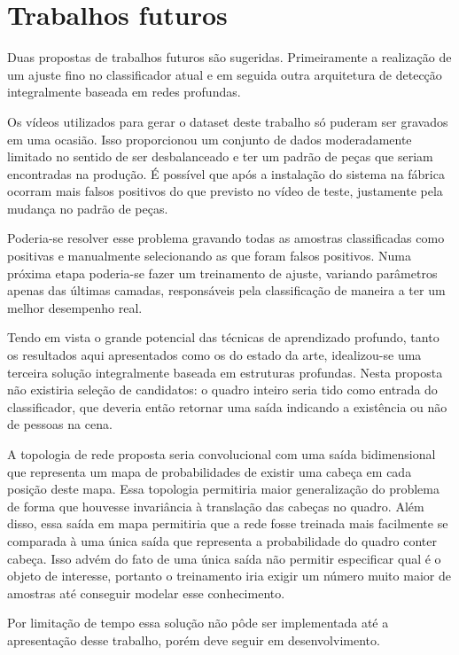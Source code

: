 \section*{Trabalhos futuros}

Duas propostas de trabalhos futuros são sugeridas. Primeiramente a realização de um ajuste fino no classificador atual e em seguida outra arquitetura de detecção integralmente baseada em redes profundas.

Os vídeos utilizados para gerar o dataset deste trabalho só puderam ser gravados em uma ocasião. Isso proporcionou um conjunto de dados moderadamente limitado no sentido de ser desbalanceado e ter um padrão de peças que seriam encontradas na produção. É possível que após a instalação do sistema na fábrica ocorram mais falsos positivos do que previsto no vídeo de teste, justamente pela mudança no padrão de peças.

Poderia-se resolver esse problema gravando todas as amostras classificadas como positivas e manualmente selecionando as que foram falsos positivos. Numa próxima etapa poderia-se fazer um treinamento de ajuste, variando parâmetros apenas das últimas camadas, responsáveis pela classificação de maneira a ter um melhor desempenho real.

Tendo em vista o grande potencial das técnicas de aprendizado profundo, tanto os resultados aqui apresentados como os do estado da arte, idealizou-se uma terceira solução integralmente baseada em estruturas profundas. Nesta proposta não existiria seleção de candidatos: o quadro inteiro seria tido como entrada do classificador, que deveria então retornar uma saída indicando a existência ou não de pessoas na cena.

A topologia de rede proposta seria convolucional com uma saída bidimensional que representa um mapa de probabilidades de existir uma cabeça em cada posição deste mapa. Essa topologia permitiria maior generalização do problema de forma que houvesse invariância à translação das cabeças no quadro. Além disso, essa saída em mapa permitiria que a rede fosse treinada mais facilmente se comparada à uma única saída que representa a probabilidade do quadro conter cabeça. Isso advém do fato de uma única saída não permitir especificar qual é o objeto de interesse, portanto o treinamento iria exigir um número muito maior de amostras até conseguir modelar esse conhecimento.

Por limitação de tempo essa solução não pôde ser implementada até a apresentação desse trabalho, porém deve seguir em desenvolvimento.
